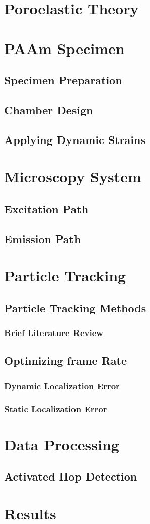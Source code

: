 \section{Poroelastic Theory}
\section{PAAm Specimen}
\subsection{Specimen Preparation}
\subsection{Chamber Design}
\subsection{Applying Dynamic Strains}
\section{Microscopy System}
\subsection{Excitation Path}
\subsection{Emission Path}
\section{Particle Tracking}
\subsection{Particle Tracking Methods}
	\subsubsection{Brief Literature Review}
	\subsection{Optimizing frame Rate}
	\subsubsection{Dynamic Localization Error}
	\subsubsection{Static Localization Error}
\section{Data Processing}
\subsection{Activated Hop Detection}
\subsection{}
\section{Results}